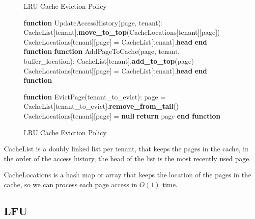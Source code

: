 \begin{figure}[htbp]
    \centering
    \begin{minipage}{\linewidth}
    \begin{algorithm}[H]
        \caption{LRU Cache Eviction Policy}
        \begin{algorithmic}
            \STATE \textbf{function} UpdateAccessHistory(page, tenant):
            \STATE \hspace{\algorithmicindent} CacheList[tenant].\textbf{move\_to\_top}(CacheLocations[tenant][page])
            \STATE \hspace{\algorithmicindent} CacheLocations[tenant][page] = CacheList[tenant].\textbf{head}
            \STATE \textbf{end function}
            \STATE
            \STATE \textbf{function} AddPageToCache(page, tenant, buffer\_location):
            \STATE \hspace{\algorithmicindent} CacheList[tenant].\textbf{add\_to\_top}(page)
            \STATE \hspace{\algorithmicindent} CacheLocations[tenant][page] = CacheList[tenant].\textbf{head}
            \STATE \textbf{end function}

            \STATE
            \STATE \textbf{function} EvictPage(tenant\_to\_evict):
            \STATE \hspace{\algorithmicindent} page = CacheList[tenant\_to\_evict].\textbf{remove\_from\_tail}()
            \STATE \hspace{\algorithmicindent} CacheLocations[tenant][page] = \textbf{null}
            \STATE \hspace{\algorithmicindent} \textbf{return} page
            \STATE \textbf{end function}
        \end{algorithmic}
    \end{algorithm}
    \caption{LRU Cache Eviction Policy}
    \label{fig:lru}
    \end{minipage}
\end{figure}

CacheList is a doubly linked list per tenant, that keeps the pages in the cache,
in the order of the access history, the head of the list is the most recently used
page.

CacheLocations is a hash map or array that keeps the location of the pages in the cache,
so we can process each page access in $O(1)$ time.

\subsection{LFU}

